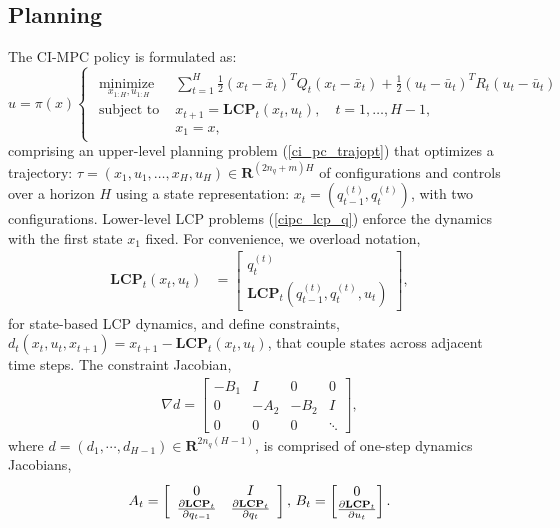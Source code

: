 \subsection{Planning}
The CI-MPC policy is formulated as: 
\begin{equation}
	u = \pi(x)
	\begin{cases}
		\begin{array}{ll}
			\underset{x_{1:H}, u_{1:H}}{\mbox{minimize }}  & \sum \limits_{t = 1}^{H} \frac{1}{2}(x_t - \bar{x}_t)^T Q_t (x_t - \bar{x}_t) + \frac{1}{2}(u_t - \bar{u}_t)^T R_t (u_t - \bar{u}_t) \\
			\mbox{subject to } & x_{t+1} =\textbf{LCP}_t(x_t, u_t), \quad t = 1, \dots, H-1, \\
			& x_1 = x,
		\end{array}
	\end{cases}
	\label{ci_mpc_policy}
\end{equation}
comprising an upper-level planning problem (\ref{ci_pc_trajopt}) that optimizes a trajectory: $\tau = (x_1, u_1,\dots, x_H, u_H) \in \mathbf{R}^{(2 n_q + m) H}$ of configurations and controls over a horizon $H$ using a state representation: $x_t = (q^{(t)}_{t-1}, q^{(t)}_{t})$, with two configurations. Lower-level LCP problems (\ref{cipc_lcp_q}) enforce the dynamics with the first state $x_1$ fixed. For convenience, we overload notation, 
\begin{align}
	\textbf{LCP}_t(x_t, u_t) &= \begin{bmatrix} q^{(t)}_{t} \\  \textbf{LCP}_t(q_{t-1}^{(t)}, q_t^{(t)}, u_t) \end{bmatrix}, 
\end{align}
for state-based LCP dynamics, and define constraints, $d_t(x_t, u_t, x_{t+1}) = x_{t+1} - \textbf{LCP}_t(x_t, u_t)$, that couple states across adjacent time steps. The constraint Jacobian,
\begin{align}
	\nabla d = \begin{bmatrix} 
		-B_1 & I & 0 & 0 \\
		0 & -A_2 & -B_2 & I \\
		0 & 0 & 0 & \ddots 
	\end{bmatrix},
\end{align}
where $d = (d_1, \cdots, d_{H-1}) \in \mathbf{R}^{2n_q(H-1)}$, is comprised of one-step dynamics Jacobians,
\begin{equation}
	A_t = \left[\begin{array}{c c} 0 & I \\ \frac{\partial \textbf{LCP}_t}{\partial q_{t-1}} & \frac{\partial \textbf{LCP}_t}{\partial q_{t}} \end{array} \right],\, B_t = \begin{bmatrix} 0 \\ \frac{\partial \textbf{LCP}_t}{\partial u_t} \end{bmatrix}.
\end{equation}

